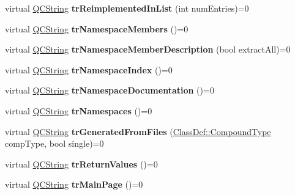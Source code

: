 \begin{DoxyCompactItemize}
\item 
\mbox{\label{class_translator_a4c9b9e653e7d5b65307b2fd68c3c1dfb}} 
virtual \mbox{\hyperlink{class_q_c_string}{Q\+C\+String}} {\bfseries tr\+Reimplemented\+In\+List} (int num\+Entries)=0
\item 
\mbox{\label{class_translator_ad4395d9d41cc9ab23624034e328401b5}} 
virtual \mbox{\hyperlink{class_q_c_string}{Q\+C\+String}} {\bfseries tr\+Namespace\+Members} ()=0
\item 
\mbox{\label{class_translator_acfb4ee07ff2d845063e70216569fad6c}} 
virtual \mbox{\hyperlink{class_q_c_string}{Q\+C\+String}} {\bfseries tr\+Namespace\+Member\+Description} (bool extract\+All)=0
\item 
\mbox{\label{class_translator_a283f3fe348325ea95b6d65add32af790}} 
virtual \mbox{\hyperlink{class_q_c_string}{Q\+C\+String}} {\bfseries tr\+Namespace\+Index} ()=0
\item 
\mbox{\label{class_translator_a0760fb42dec2f5417768814ed628a26a}} 
virtual \mbox{\hyperlink{class_q_c_string}{Q\+C\+String}} {\bfseries tr\+Namespace\+Documentation} ()=0
\item 
\mbox{\label{class_translator_aeb0ea0117f3c89b8d35780b8d5aa3640}} 
virtual \mbox{\hyperlink{class_q_c_string}{Q\+C\+String}} {\bfseries tr\+Namespaces} ()=0
\item 
\mbox{\label{class_translator_ab6cb87a7a16f256661ea6e7e08d333cb}} 
virtual \mbox{\hyperlink{class_q_c_string}{Q\+C\+String}} {\bfseries tr\+Generated\+From\+Files} (\mbox{\hyperlink{class_class_def_ae70cf86d35fe954a94c566fbcfc87939}{Class\+Def\+::\+Compound\+Type}} comp\+Type, bool single)=0
\item 
\mbox{\label{class_translator_af3f57cf1b57db46a8958688c4945daad}} 
virtual \mbox{\hyperlink{class_q_c_string}{Q\+C\+String}} {\bfseries tr\+Return\+Values} ()=0
\item 
\mbox{\label{class_translator_ae315af2d9a5d19fb5df34e76c5b0a182}} 
virtual \mbox{\hyperlink{class_q_c_string}{Q\+C\+String}} {\bfseries tr\+Main\+Page} ()=0

\end{DoxyCompactItemize}
